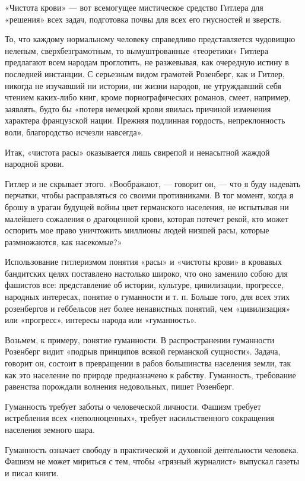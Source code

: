 \documentclass[12pt, a4paper, openany]{book}
\begin{document}
«Чистота крови» — вот всемогущее мистическое средство Гитлера для «решения» всех задач, подготовка почвы для всех его гнусностей и зверств.

То, что каждому нормальному человеку справедливо представляется чудовищно нелепым, сверхбезграмотным, то вымуштрованные «теоретики» Гитлера предлагают всем народам проглотить, не разжевывая, как очередную истину в последней инстанции. С серьезным видом грамотей Розенберг, как и Гитлер, никогда не изучавший ни истории, ни жизни народов, не утруждавший себя чтением каких-либо книг, кроме порнографических романов, смеет, например, заявлять, будто бы «потеря немецкой крови явилась причиной изменения характера французской нации. Прежняя подлинная гордость, непреклонность воли, благородство исчезли навсегда».

Итак, «чистота расы» оказывается лишь свирепой и ненасытной жаждой народной крови.

Гитлер и не скрывает этого. «Воображают, — говорит он, — что я буду надевать перчатки, чтобы расправляться со своими противниками. В тог момент, когда я брошу в ураган будущей войны цвет германского населения, не испытывая ни малейшего сожаления о драгоценной крови, которая потечет рекой, кто может оспорить мое право уничтожить миллионы людей низшей расы, которые размножаются, как насекомые?»

Использование гитлеризмом понятия «расы» и «чистоты крови» в кровавых бандитских целях поставлено настолько широко, что оно заменило собою для фашистов все: представление об истории, культуре, цивилизации, прогрессе, народных интересах, понятие о гуманности и т. п. Больше того, для всех этих розенбергов и геббельсов нет более ненавистных понятий, чем «цивилизация» или «прогресс», интересы народа или «гуманность».

Возьмем, к примеру, понятие гуманности. В распространении гуманности Розенберг видит «подрыв принципов всякой германской сущности». Задача, говорит он, состоит в превращении в рабов большинства населения земли, так как это население по природе предназначено к рабству. Гуманность, требование равенства порождали волнения недовольных, пишет Розенберг.

Гуманность требует заботы о человеческой личности. Фашизм требует истребления всех «неполноценных», требует насильственного сокращения населения земного шара.

Гуманность означает свободу в практической и духовной деятельности человека. Фашизм не может мириться с тем, чтобы «грязный журналист» выпускал газеты и писал книги.
\end{document}
